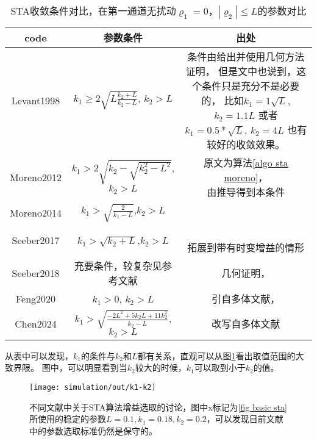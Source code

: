 \begin{table}[!htb]
	\centering
	\begin{tabular}{c|c|c}
		\hline
		code & 参数条件  & 出处 \\\hline
		Levant1998 &
		$k_1\geq 2\sqrt{L\frac{k_2+L}{k_2-L}}$, $k_2>L$ &
		\makecell{
			条件由\cite[eq 6]{levantRobustExactDifferentiation1998}给出并使用几何方法证明，\\
			但是文中也说到，这个条件只是充分不是必要的，\\
			比如$k_1=1\sqrt{L}$,
			$k_2=1.1L$ 或者 \\
			$k_1=0.5*\sqrt{L}$,
			$k_2=4L$
			也有较好的收敛效果。
		}
		\\\hline 
		Moreno2012 &
			$k_1>2\sqrt{k_2-\sqrt{k_2^2-L^2}}$, $k_2>L$
		&
			\makecell{
			原文为算法\ref{algo sta moreno}\cite[algorithm 1]{morenoStrictLyapunovFunctions2012}，\\
			由\cite{seeberStabilityProofWellestablished2017}推导得到本条件
		}
		\\\hline
		Moreno2014 &
		$k_1>\sqrt{\frac{2}{k_1-L}}$,$k_2>L$
		&
		\cite{morenoStrictLyapunovFunctions2014}
		\\\hline
		Seeber2017&
		$k_1>\sqrt{k_2+L}$,$k_2>L$ &
		\makecell{
		\cite{seeberStabilityProofWellestablished2017}\\
		\cite{colottiNewConvergenceConditions2022}拓展到带有时变增益的情形
		}
		\\\hline
		Seeber2018 &
		充要条件，较复杂见参考文献
		&
		几何证明，\cite{seeberNecessarySufficientStability2018}
		\\\hline
		Feng2020 &
		$k_1 >0$,
		$k_2>L$& 
		引自多体文献\cite{fengFinitetimeDistributedConvex2020}，
		\\\hline
		Chen2024 &
		$k_1 >\sqrt{\frac{-2L^2+5k_2L+11k_2^2}{k_2-L}} $,
		$k_2>L$&
		改写自多体文献\cite{chenDistributedFinitetimeDifferentiator2024}
		\\\hline
	\end{tabular}
	\caption{STA收敛条件对比，在第一通道无扰动$\varrho_1=0$，$|\varrho_2|\leq L$的参数对比}
	\label{table sta gain selection}
\end{table}
从表中可以发现，$k_1$的条件与$k_2$和$L$都有关系，直观可以从图\ref{fig sta gain selection}看出取值范围的大致界限。
图中，可以明显看到当$k_2$较大的时候，$k_1$可以取到小于$k_2$的值。

\begin{figure}[!htb]
	\centering
	\texttt{[image: simulation/out/k1-k2]}
	\caption{不同文献中关于STA算法增益选取的讨论，图中x标记为\ref{fig basic sta}所使用的稳定的参数$L=0.1,k_1=0.18,k_2=0.2$，可以发现目前文献中的参数选取标准仍然是保守的。}
	\label{fig sta gain selection}
\end{figure}


